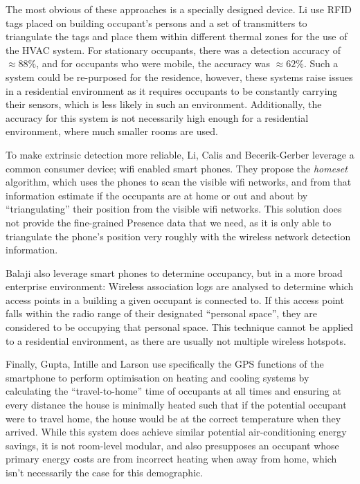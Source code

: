 \documentclass[../thesis/thesis.tex]{subfiles}
\begin{document}
The most obvious of these approaches is a specially designed device. Li \etal \cite{li2012measuring} use RFID tags placed on building occupant's persons and a set of transmitters to triangulate the tags and place them within different thermal zones for the use of the HVAC system. For stationary occupants, there was a detection accuracy of $\approx88\%$, and for occupants who were mobile, the accuracy was $\approx62\%$. Such a system could be re-purposed for the residence, however, these systems raise issues in a residential environment as it requires occupants to be constantly carrying their sensors, which is less likely in such an environment. Additionally, the accuracy for this system is not necessarily high enough for a residential environment, where much smaller rooms are used.

To make extrinsic detection more reliable, Li, Calis and Becerik-Gerber \cite{kleiminger2013inferring} leverage a common consumer device; wifi enabled smart phones. They propose the \textit{homeset} algorithm, which uses the phones to scan the visible wifi networks, and from that information estimate if the occupants are at home or out and about by ``triangulating'' their position from the visible wifi networks. This solution does not provide the fine-grained Presence data that we need, as it is only able to triangulate the phone's position very roughly with the wireless network detection information.

Balaji \etal \cite{balaji2013sentinel} also leverage smart phones to determine occupancy, but in a more broad enterprise environment: Wireless association logs are analysed to determine which access points in a building a given occupant is connected to. If this access point falls within the radio range of their designated ``personal space'', they are considered to be occupying that personal space. This technique cannot be applied to a residential environment, as there are usually not multiple wireless hotspots.

Finally, Gupta, Intille and Larson \cite{gupta2009adding} use specifically the GPS functions of the smartphone to perform optimisation on heating and cooling systems by calculating the ``travel-to-home'' time of occupants at all times and ensuring at every distance the house is minimally heated such that if the potential occupant were to travel home, the house would be at the correct temperature when they arrived. While this system does achieve similar potential air-conditioning energy savings, it is not room-level modular, and also presupposes an occupant whose primary energy costs are from incorrect heating when away from home, which isn't necessarily the case for this demographic.
\end{document}
